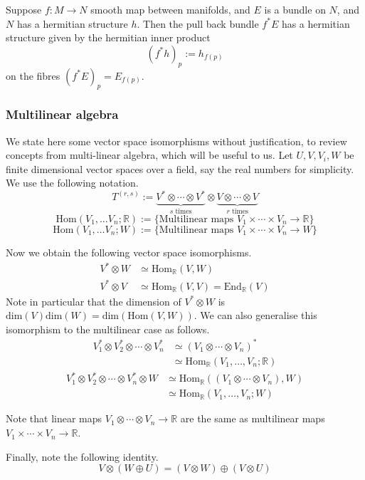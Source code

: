 \documentclass[a4paper]{article}
\theoremstyle{definition} \newtheorem*{definition}{Definition}
\theoremstyle{definition} \newtheorem*{definitions}{Definitions}
\theoremstyle{plain} \newtheorem{theorem}{Theorem}[section]
\theoremstyle{plain} \newtheorem{proposition}[theorem]{Proposition}
\theoremstyle{plain} \newtheorem{corollary}[theorem]{Corollary}
\theoremstyle{plain} \newtheorem{lemma}[theorem]{Lemma}
\theoremstyle{plain} \newtheorem{example}[theorem]{Example}
\newcommand{\realnos}{\mathbb{R}}
\newcommand{\Hom}{\text{Hom}}
\begin{document}
Suppose $f:M\to N$ smooth map between manifolds, and $E$ is a bundle on $N$, and $N$ has a hermitian structure $h$. Then the pull back bundle $f^*E$ has a hermitian structure given by the hermitian inner product
$$(f^*h)_p:=h_{f(p)}$$
on the fibres $(f^*E)_p=E_{f(p)}$.

\subsubsection{Multilinear algebra}
We state here some vector space isomorphisms without justification, to review concepts from multi-linear algebra, which will be useful to us. Let $U, V, V_i, W$ be finite dimensional vector spaces over a field, say the real numbers for simplicity. We use the following notation.
$$T^{(r,s)}:=\underbrace{V^*\otimes \cdots \otimes V^*}_{s \text{ times}} \otimes \underbrace{V \otimes \cdots \otimes V}_{r \text{ times}} $$
$$\Hom(V_1, \ldots V_n; \realnos):= \{\text{Multilinear maps } V_1\times \cdots \times V_n \to \realnos\}$$
$$\Hom(V_1, \ldots V_n; W):= \{\text{Multilinear maps } V_1\times \cdots \times V_n \to W\}$$

Now we obtain the following vector space isomorphisms.
\begin{align*}
V^*\otimes W & \simeq \Hom_\realnos(V, W) \\
V^*\otimes V & \simeq \Hom_\realnos(V, V) = \text{End}_\realnos (V) 
\end{align*}
Note in particular that the dimension of $V^*\otimes W$ is $\text{dim}(V)\text{dim}(W)=\text{dim}(\Hom(V, W))$. We can also generalise this isomorphism to the multilinear case as follows.
\begin{align*}
V_1^* \otimes V_2^* \otimes \cdots \otimes V_n^* & \simeq (V_1\otimes \cdots \otimes V_n)^* \\
& \simeq \Hom_\realnos (V_1, \ldots, V_n; \realnos) 
\end{align*}
\begin{align*}
V_1^* \otimes V_2^* \otimes \cdots \otimes V_n^* \otimes W & \simeq \Hom_\realnos((V_1\otimes \cdots \otimes V_n), W) \\
& \simeq \Hom_\realnos (V_1, \ldots, V_n; W) 
\end{align*}

Note that linear maps $V_1\otimes \cdots \otimes V_n\to \realnos$ are the same as multilinear maps $V_1\times \cdots \times V_n \to \realnos$.

Finally, note the following identity.
$$V\otimes (W\oplus U)=(V\otimes W)\oplus (V\otimes U)$$
\end{document}
